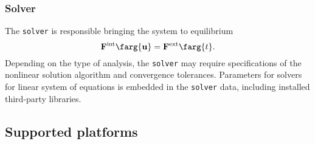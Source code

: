 \subsubsection{Solver}
The \texttt{solver} is responsible bringing the system to equilibrium
\[
\mathbf{F}^{\textrm{int}}\farg{\mathbf{u}} =
\mathbf{F}^{\textrm{ext}}\farg{t}.
\]
Depending on the type of analysis, the \texttt{solver} may require 
specifications of the nonlinear solution algorithm and 
convergence tolerances. 
Parameters for solvers for linear system of equations is embedded in 
the \texttt{solver} data, including installed third-party libraries.

\subsection{Supported platforms}

